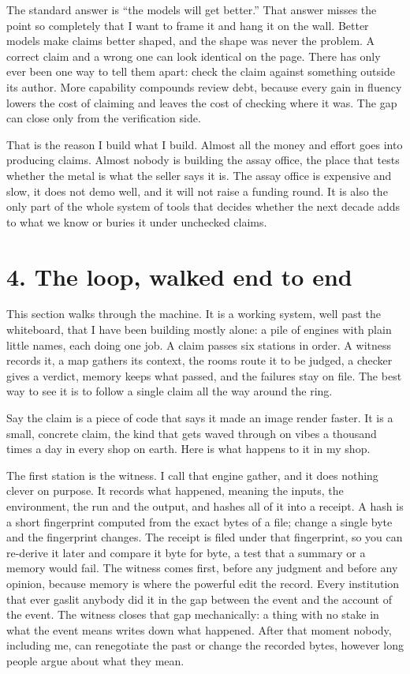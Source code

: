 \documentclass[11pt]{article}
\begin{document}
The standard answer is ``the models will get better.'' That answer misses the point so completely that I want to frame it and hang it on the wall. Better models make claims better shaped, and the shape was never the problem. A correct claim and a wrong one can look identical on the page. There has only ever been one way to tell them apart: check the claim against something outside its author. More capability compounds review debt, because every gain in fluency lowers the cost of claiming and leaves the cost of checking where it was. The gap can close only from the verification side.

That is the reason I build what I build. Almost all the money and effort goes into producing claims. Almost nobody is building the assay office, the place that tests whether the metal is what the seller says it is. The assay office is expensive and slow, it does not demo well, and it will not raise a funding round. It is also the only part of the whole system of tools that decides whether the next decade adds to what we know or buries it under unchecked claims.

\section*{4. The loop, walked end to end}

This section walks through the machine. It is a working system, well past the whiteboard, that I have been building mostly alone: a pile of engines with plain little names, each doing one job. A claim passes six stations in order. A witness records it, a map gathers its context, the rooms route it to be judged, a checker gives a verdict, memory keeps what passed, and the failures stay on file. The best way to see it is to follow a single claim all the way around the ring.

Say the claim is a piece of code that says it made an image render faster. It is a small, concrete claim, the kind that gets waved through on vibes a thousand times a day in every shop on earth. Here is what happens to it in my shop.

The first station is the witness. I call that engine gather, and it does nothing clever on purpose. It records what happened, meaning the inputs, the environment, the run and the output, and hashes all of it into a receipt. A hash is a short fingerprint computed from the exact bytes of a file; change a single byte and the fingerprint changes. The receipt is filed under that fingerprint, so you can re-derive it later and compare it byte for byte, a test that a summary or a memory would fail. The witness comes first, before any judgment and before any opinion, because memory is where the powerful edit the record. Every institution that ever gaslit anybody did it in the gap between the event and the account of the event. The witness closes that gap mechanically: a thing with no stake in what the event means writes down what happened. After that moment nobody, including me, can renegotiate the past or change the recorded bytes, however long people argue about what they mean.
\end{document}
